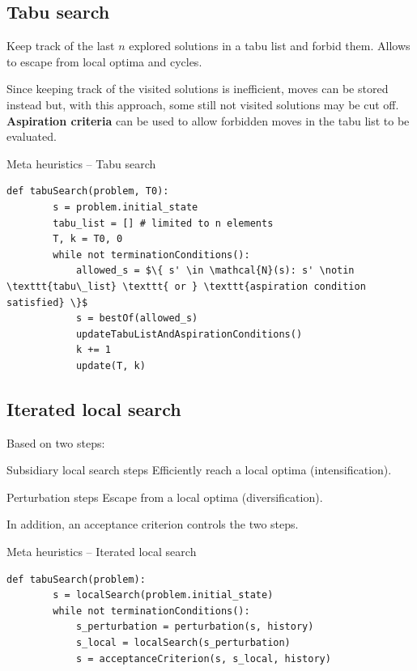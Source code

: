 \subsection{Tabu search}
Keep track of the last $n$ explored solutions in a tabu list and forbid them.
Allows to escape from local optima and cycles.

Since keeping track of the visited solutions is inefficient, 
moves can be stored instead but, with this approach, some still not visited solutions may be cut off.
\textbf{Aspiration criteria} can be used to allow forbidden moves in the tabu list to be evaluated.

\begin{algorithm}
\caption{Meta heuristics -- Tabu search}
\begin{lstlisting}[mathescape=true]
    def tabuSearch(problem, T0):
        s = problem.initial_state
        tabu_list = [] # limited to n elements
        T, k = T0, 0
        while not terminationConditions():
            allowed_s = $\{ s' \in \mathcal{N}(s): s' \notin \texttt{tabu\_list} \texttt{ or } \texttt{aspiration condition satisfied} \}$
            s = bestOf(allowed_s)
            updateTabuListAndAspirationConditions()
            k += 1
            update(T, k)
\end{lstlisting}
\end{algorithm}


\subsection{Iterated local search}
Based on two steps:
\begin{descriptionlist}
    \item[Subsidiary local search steps] Efficiently reach a local optima (intensification).
    \item[Perturbation steps] Escape from a local optima (diversification).
\end{descriptionlist}
In addition, an acceptance criterion controls the two steps.

\begin{algorithm}
\caption{Meta heuristics -- Iterated local search}
\begin{lstlisting}[mathescape=true]
    def tabuSearch(problem):
        s = localSearch(problem.initial_state)
        while not terminationConditions():
            s_perturbation = perturbation(s, history)
            s_local = localSearch(s_perturbation)
            s = acceptanceCriterion(s, s_local, history)
\end{lstlisting}
\end{algorithm}



